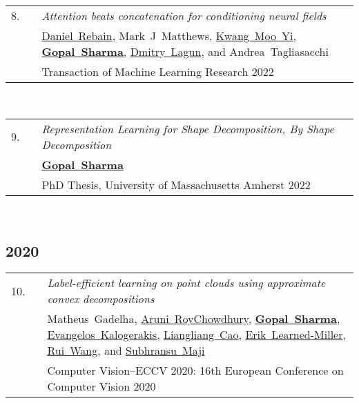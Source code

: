\documentclass[11pt,letter,sans]{moderncv}
\begin{document}
\begin{minipage}{\textwidth}
\begin{tabular}[t]{p{8mm}p{1mm}>{\raggedright\arraybackslash}p{6.5in}}
 \hfill8.\hspace*{1mm} && \textit{Attention beats concatenation for conditioning neural fields}  \\
 && \mbox{\href{}{Daniel Rebain}}, \mbox{Mark J Matthews}, \mbox{\href{}{Kwang Moo Yi}}, \mbox{\textbf{\href{hippogriff.github.io}{Gopal Sharma}}}, \mbox{\href{}{Dmitry Lagun}}, and \mbox{Andrea Tagliasacchi} \\
 && Transaction of Machine Learning Research 2022  \\
\end{tabular} \\[2mm]
\end{minipage}

\begin{minipage}{\textwidth}
\begin{tabular}[t]{p{8mm}p{1mm}>{\raggedright\arraybackslash}p{6.5in}}
 \hfill9.\hspace*{1mm} && \textit{Representation Learning for Shape Decomposition, By Shape Decomposition}  \\
 && \mbox{\textbf{\href{hippogriff.github.io}{Gopal Sharma}}} \\
 && PhD Thesis, University of Massachusetts Amherst 2022  \\
\end{tabular} \\[2mm]
\end{minipage}
\subsection{2020}

\begin{minipage}{\textwidth}
\begin{tabular}[t]{p{8mm}p{1mm}>{\raggedright\arraybackslash}p{6.5in}}
 \hfill10.\hspace*{1mm} && \textit{Label-efficient learning on point clouds using approximate convex decompositions}  \\
 && \mbox{Matheus Gadelha}, \mbox{\href{}{Aruni RoyChowdhury}}, \mbox{\textbf{\href{hippogriff.github.io}{Gopal Sharma}}}, \mbox{\href{}{Evangelos Kalogerakis}}, \mbox{\href{}{Liangliang Cao}}, \mbox{\href{}{Erik Learned-Miller}}, \mbox{\href{}{Rui Wang}}, and \mbox{\href{}{Subhransu Maji}} \\
 && Computer Vision--ECCV 2020: 16th European Conference on Computer Vision 2020  \\
\end{tabular} \\[2mm]
\end{minipage}
\end{document}
